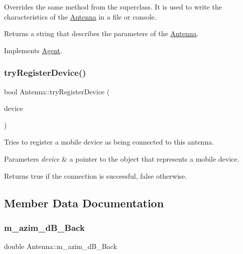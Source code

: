 Overrides the same method from the superclass. It is used to write the characteristics of the \hyperlink{class_antenna}{Antenna} in a file or console. \begin{DoxyReturn}{Returns}
a string that describes the parameters of the \hyperlink{class_antenna}{Antenna}. 
\end{DoxyReturn}


Implements \hyperlink{class_agent_a44f291596d10c7878b0641d6ec156328}{Agent}.

\mbox{\label{class_antenna_a4455f5c804e1ea520dd849dc9fd7b0b4}} 
\subsubsection{\texorpdfstring{try\+Register\+Device()}{tryRegisterDevice()}}
{\footnotesize\ttfamily bool Antenna\+::try\+Register\+Device (\begin{DoxyParamCaption}\item[{\hyperlink{class_holdable_agent}{Holdable\+Agent} $\ast$}]{device }\end{DoxyParamCaption})}

Tries to register a mobile device as being connected to this antenna. 
\begin{DoxyParams}{Parameters}
{\em device} & a pointer to the object that represents a mobile device. \\
\hline
\end{DoxyParams}
\begin{DoxyReturn}{Returns}
true if the connection is successful, false otherwise. 
\end{DoxyReturn}


\subsection{Member Data Documentation}
\mbox{\label{class_antenna_aa7ed7c0424dfd20193b550a4ececcb64}} 
\subsubsection{\texorpdfstring{m\+\_\+azim\+\_\+d\+B\+\_\+\+Back}{m\_azim\_dB\_Back}}
{\footnotesize\ttfamily double Antenna\+::m\+\_\+azim\+\_\+d\+B\+\_\+\+Back\hspace{0.3cm}{\ttfamily [private]}}

